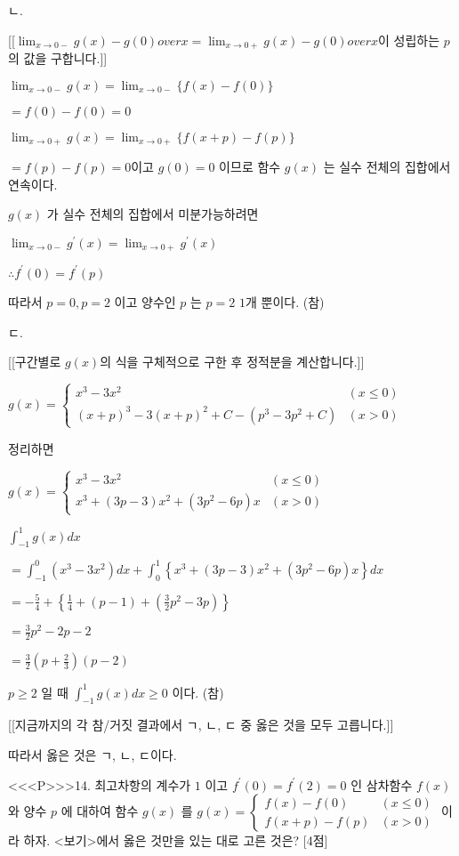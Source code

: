 \documentclass{oblivoir}
\begin{document}
ㄴ.

[[$\lim _{x \rightarrow 0-} {g(x)-g(0)} over {x} = \lim _{x \rightarrow 0+} {g(x)-g(0)} over {x}$이 성립하는 $p$의 값을 구합니다.]]

$\lim _{x \rightarrow 0-} g(x)=\lim _{x \rightarrow 0-}\{f(x)-f(0)\}$

$=f(0)-f(0)=0$

$\lim _{x \rightarrow 0+} g(x)=\lim _{x \rightarrow 0+}\{f(x+p)-f(p)\}$

$=f(p)-f(p)=0$이고 $g(0)=0$ 이므로 함수 $g(x)$ 는 실수 전체의 집합에서 연속이다.

$g(x)$ 가 실수 전체의 집합에서 미분가능하려면

$\lim _{x \rightarrow 0-} g^{\prime}(x)=\lim _{x \rightarrow 0+} g^{\prime}(x)$

$\therefore f^{\prime}(0)=f^{\prime}(p)$

따라서 $p=0, p=2$ 이고 양수인 $p$ 는 $p=2$ $1$개 뿐이다. (참)

ㄷ.

[[구간별로 $g(x)$의 식을 구체적으로 구한 후 정적분을 계산합니다.]]

$g(x)= \begin{cases}x^{3}-3 x^{2} & (x \leq 0)\\ (x+p)^{3}-3(x+p)^{2}+C-\left(p^{3}-3 p^{2}+C\right) &(x>0)\end{cases}$

정리하면

$g(x)=\begin{cases}
x^{3}-3 x^{2} & (x \leq 0)\\
x^{3}+(3 p-3) x^{2}+\left(3 p^{2}-6 p\right) x & (x>0)
\end{cases}$

$\int_{-1}^{1} g(x) d x$

$=\int_{-1}^{0}\left(x^{3}-3 x^{2}\right)dx+\int_{0}^{1}\left\{x^{3}+(3 p-3) x^{2}+\left(3 p^{2}-6 p\right) x\right\} d x$

$=-\frac{5}{4}+\left\{\frac{1}{4}+(p-1)+\left(\frac{3}{2} p^{2}-3 p\right)\right\}$

$=\frac{3}{2} p^{2}-2 p-2$

$=\frac{3}{2}\left(p+\frac{2}{3}\right)(p-2)$

$p \geq 2 $ 일 때 $\int_{-1}^{1} g(x) d x \geq 0 $ 이다. (참)

[[지금까지의 각 참/거짓 결과에서 ㄱ, ㄴ, ㄷ 중 옳은 것을 모두 고릅니다.]]

따라서 옳은 것은 ㄱ, ㄴ, ㄷ이다.


<<<P>>>14. 최고차항의 계수가 $1$ 이고 $f^{\prime}(0)=f^{\prime}(2)=0$ 인 삼차함수 $f(x)$ 와 양수 $p$ 에 대하여 함수 $g(x)$ 를
$g(x)= \begin{cases}f(x)-f(0) & (x \leq 0) \\ f(x+p)-f(p) & (x>0)\end{cases}$
이라 하자. <보기>에서 옳은 것만을 있는 대로 고른 것은? [4점]
\end{document}
